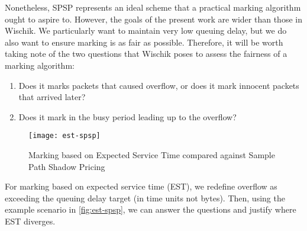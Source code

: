 Nonetheless, SPSP represents an ideal scheme that a practical marking algorithm
ought to aspire to. %
However, the goals of the present work are wider than those in Wischik. We particularly want to maintain very low queuing delay, but we do also want to ensure marking is as fair as possible. Therefore, it will be worth taking note of the two questions that Wischik poses to assess the fairness of a marking algorithm:
\begin{enumerate}[nosep]
	\item Does it marks packets that caused overflow, or does it mark innocent packets that arrived later?
	\item Does it mark in the busy period leading up to the overflow?
\end{enumerate}
\begin{figure}[h]
	\centering
	\texttt{[image: est-spsp]}
	\caption{Marking based on Expected Service Time compared against Sample Path Shadow Pricing}\label{fig:est-spsp}
\end{figure}
For marking based on expected service time (EST), we redefine overflow as exceeding the queuing delay target (in time units not bytes). Then, using the example scenario in \autoref{fig:est-spsp}, we can answer the questions and justify where EST diverges. 

